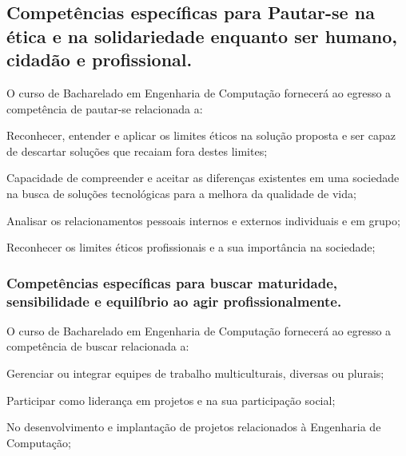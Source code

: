 \subsection*{Competências específicas para Pautar-se na ética e na solidariedade enquanto ser humano, cidadão e profissional.}

O curso de Bacharelado em Engenharia de Computação fornecerá ao egresso a competência de pautar-se relacionada a:
\begin{compitem}
    \item Reconhecer, entender e aplicar os limites éticos na solução proposta e ser capaz de descartar soluções que recaiam fora destes limites;
    \item Capacidade de compreender e aceitar as diferenças existentes em uma sociedade na busca de soluções tecnológicas para a melhora da qualidade de vida; %
    \item Analisar os relacionamentos pessoais internos e externos individuais e em grupo;
    \item Reconhecer os limites éticos profissionais e a sua importância na sociedade;
\end{compitem}

\subsubsection{Competências específicas para buscar maturidade, sensibilidade e equilíbrio ao agir profissionalmente.}

O curso de Bacharelado em Engenharia de Computação fornecerá ao egresso a competência de buscar relacionada a:
\begin{compitem}
    \item Gerenciar ou integrar equipes de trabalho multiculturais, diversas ou plurais;%
    \item Participar como liderança em projetos e na sua participação social;
    \item No desenvolvimento e implantação de projetos relacionados à Engenharia de Computação;
\end{compitem}


